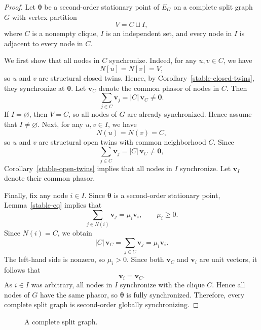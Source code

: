 \documentclass[11pt,reqno]{amsart}
\theoremstyle{definition}
\begin{document}
\begin{proof}
Let $\boldsymbol{\theta}$ be a second-order stationary point of $E_G$ on a complete split graph $G$ with vertex partition
\[
V=C\sqcup I,
\]
where $C$ is a nonempty clique, $I$ is an independent set, and every node in $I$ is adjacent to every node in $C$.

We first show that all nodes in $C$ synchronize. Indeed, for any $u,v\in C$, we have
\[
N[u]=N[v]=V,
\]
so $u$ and $v$ are structural closed twins. Hence, by Corollary~\ref{stable-closed-twins}, they synchronize at $\boldsymbol{\theta}$.
Let $\mathbf{v}_C$ denote the common phasor of nodes in $C$. Then
\[
\sum_{j\in C}\mathbf{v}_j
=
|C|\,\mathbf{v}_C
\neq \mathbf{0}.
\]
If $I=\varnothing$, then $V=C$, so all nodes of $G$
are already synchronized.
Hence assume that $I\neq\varnothing$.
Next, for any $u,v\in I$, we have
\[
N(u)=N(v)=C,
\]
so $u$ and $v$ are structural open twins with common neighborhood $C$. Since
\[
\sum_{j\in C}\mathbf{v}_j
=
|C|\,\mathbf{v}_C
\neq \mathbf{0},
\]
Corollary~\ref{stable-open-twins} implies that all nodes in $I$ synchronize. Let $\mathbf{v}_I$ denote their common phasor.

Finally, fix any node $i\in I$. Since $\boldsymbol{\theta}$ is a second-order stationary point, Lemma~\ref{stable-eq} implies that
\[
\sum_{j\in N(i)}\mathbf{v}_j
=
\mu_i\mathbf{v}_i,
\qquad
\mu_i\ge 0.
\]
Since $N(i)=C$, we obtain
\[
|C|\,\mathbf{v}_C
=
\sum_{j\in C}\mathbf{v}_j
=
\mu_i\mathbf{v}_i.
\]
The left-hand side is nonzero, so $\mu_i>0$. Since both $\mathbf{v}_C$ and $\mathbf{v}_i$ are unit vectors, it follows that
\[
\mathbf{v}_i=\mathbf{v}_C.
\]
As $i\in I$ was arbitrary, all nodes in $I$ synchronize with the clique $C$. Hence all nodes of $G$ have the same phasor, so $\boldsymbol{\theta}$ is fully synchronized. Therefore, every complete split graph is second-order globally synchronizing.
\end{proof}
\begin{figure}[H]
\centering
{}
\caption{A complete split graph.}
\end{figure}
\end{document}

